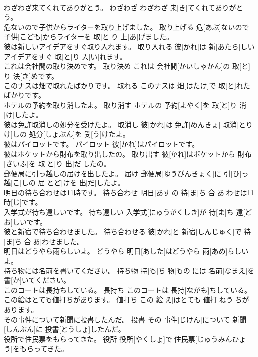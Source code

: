 \documentclass[8pt]{extreport}
\begin{document}
\begin{CJK}{UTF8}{min}
\\	わざわざ来てくれてありがとう。	わざわざ	わざわざ 来[き]てくれてありがとう。	
\\	危ないので子供からライターを取り上げました。	取り上げる	危[あぶ]ないので 子供[こども]からライターを 取[と]り 上[あ]げました。	
\\	彼は新しいアイデアをすぐ取り入れます。	取り入れる	彼[かれ]は 新[あたら]しいアイデアをすぐ 取[と]り 入[い]れます。	
\\	これは会社間の取り決めです。	取り決め	これは 会社間[かいしゃかん]の 取[と]り 決[き]めです。	
\\	このナスは畑で取れたばかりです。	取れる	このナスは 畑[はたけ]で 取[と]れたばかりです。	
\\	ホテルの予約を取り消したよ。	取り消す	ホテルの 予約[よやく]を 取[と]り 消[け]したよ。	
\\	彼は免許取消しの処分を受けたよ。	取消し	彼[かれ]は 免許[めんきょ] 取消[とりけ]しの 処分[しょぶん]を 受[う]けたよ。	
\\	彼はパイロットです。	パイロット	彼[かれ]はパイロットです。	
\\	彼はポケットから財布を取り出したの。	取り出す	彼[かれ]はポケットから 財布[さいふ]を 取[と]り 出[だ]したの。	
\\	郵便局に引っ越しの届けを出したよ。	届け	郵便局[ゆうびんきょく]に 引[ひ]っ 越[こ]しの 届[とど]けを 出[だ]したよ。	
\\	明日の待ち合わせは11時です。	待ち合わせ	明日[あす]の 待[ま]ち 合[あ]わせは11 時[じ]です。	
\\	入学式が待ち遠しいです。	待ち遠しい	入学式[にゅうがくしき]が 待[ま]ち 遠[どお]しいです。	
\\	彼と新宿で待ち合わせました。	待ち合わせる	彼[かれ]と 新宿[しんじゅく]で 待[ま]ち 合[あ]わせました。	
\\	明日はどうやら雨らしいよ。	どうやら	明日[あした]はどうやら 雨[あめ]らしいよ。	
\\	持ち物には名前を書いてください。	持ち物	持[も]ち 物[もの]には 名前[なまえ]を 書[か]いてください。	
\\	このコートは長持ちしている。	長持ち	このコートは 長持[ながも]ちしている。	
\\	この絵はとても値打ちがあります。	値打ち	この 絵[え]はとても 値打[ねう]ちがあります。	
\\	その事件について新聞に投書したんだ。	投書	その 事件[じけん]について 新聞[しんぶん]に 投書[とうしょ]したんだ。	
\\	役所で住民票をもらってきた。	役所	役所[やくしょ]で 住民票[じゅうみんひょう]をもらってきた。	

\end{CJK}
\end{document}
